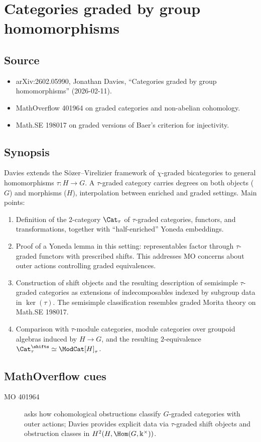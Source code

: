 \section*{Categories graded by group homomorphisms}
\subsection*{Source}
\begin{itemize}
  \item arXiv:2602.05990, Jonathan Davies, ``Categories graded by group homomorphisms'' (2026-02-11).
  \item MathOverflow 401964 on graded categories and non-abelian cohomology.
  \item Math.SE 198017 on graded versions of Baer's criterion for injectivity.
\end{itemize}
\subsection*{Synopsis}
Davies extends the Sözer--Virelizier framework of $\chi$-graded bicategories to general homomorphisms $\tau\colon H\to G$. A $\tau$-graded category carries degrees on both objects ($G$) and morphisms ($H$), interpolation between enriched and graded settings. Main points:
\begin{enumerate}
  \item Definition of the $2$-category $\Cat_{\tau}$ of $\tau$-graded categories, functors, and transformations, together with ``half-enriched'' Yoneda embeddings.
  \item Proof of a Yoneda lemma in this setting: representables factor through $\tau$-graded functors with prescribed shifts. This addresses MO concerns about outer actions controlling graded equivalences.
  \item Construction of shift objects and the resulting description of semisimple $\tau$-graded categories as extensions of indecomposables indexed by subgroup data in $\ker(\tau)$. The semisimple classification resembles graded Morita theory on Math.SE 198017.
  \item Comparison with $\tau$-module categories, module categories over groupoid algebras induced by $H \to G$, and the resulting $2$-equivalence $\Cat_{\tau}^{\shifts} \simeq \ModCat[H]_{\tau}$.
\end{enumerate}
\subsection*{MathOverflow cues}
\begin{description}
  \item[MO 401964] asks how cohomological obstructions classify $G$-graded categories with outer actions; Davies provides explicit data via $\tau$-graded shift objects and obstruction classes in $H^2(H,\Hom(G,\Bbbk^{\times}))$.
\end{description}

